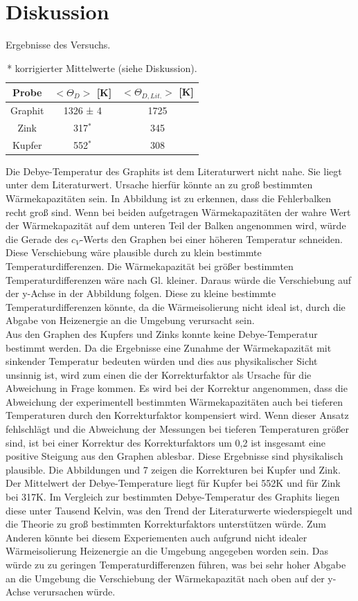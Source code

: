 \documentclass[12pt,a4paper,titlepage,headinclude,bibtotoc]{scrartcl}
\begin{document}
\section{Diskussion}
\begin{table}[h!]
\centering
\caption{Ergebnisse des Versuchs.}
\begin{tabular}{c|c|c}
Probe& $<\Theta_D >$ [K]& $<\Theta_{D,Lit.}>$ [K] \\
\hline
Graphit &1326 ± 4 & 1725\\
\hline
Zink & 317$^*$ & 345\\
\hline
Kupfer & 552$^*$ &308\\
\end{tabular}
\caption*{* korrigierter Mittelwerte (siehe Diskussion).}
\end{table}
\FloatBarrier
Die Debye-Temperatur des Graphits ist dem Literaturwert nicht nahe. Sie liegt unter dem Literaturwert. Ursache hierfür könnte an zu groß bestimmten Wärmekapazitäten sein. In Abbildung ist zu erkennen, dass die Fehlerbalken recht groß sind. Wenn bei beiden aufgetragen Wärmekapazitäten der wahre Wert der Wärmekapazität auf dem unteren Teil der Balken angenommen wird, würde die Gerade des $c_V$-Werts den Graphen bei einer höheren Temperatur schneiden. Diese Verschiebung wäre plausible durch zu klein bestimmte Temperaturdifferenzen. Die Wärmekapazität bei größer bestimmten Temperaturdifferenzen wäre nach Gl. kleiner. Daraus würde die Verschiebung auf der y-Achse in der Abbildung folgen. Diese zu kleine bestimmte Temperaturdifferenzen könnte, da die Wärmeisolierung nicht ideal ist, durch die Abgabe von Heizenergie an die Umgebung verursacht sein. \\
Aus den Graphen des Kupfers und Zinks konnte keine Debye-Temperatur bestimmt werden. Da die Ergebnisse eine Zunahme der Wärmekapazität mit sinkender Temperatur bedeuten würden und dies aus physikalischer Sicht unsinnig ist, wird  zum einen die der Korrekturfaktor als Ursache für die Abweichung in Frage kommen. Es wird bei der Korrektur angenommen, dass die Abweichung der experimentell bestimmten Wärmekapazitäten auch bei tieferen Temperaturen durch den Korrekturfaktor kompensiert wird. Wenn dieser Ansatz fehlschlägt und die Abweichung der Messungen bei tieferen Temperaturen größer sind, ist bei einer Korrektur des Korrekturfaktors um 0,2 ist insgesamt eine positive Steigung aus den Graphen ablesbar. Diese Ergebnisse sind physikalisch plausible. Die Abbildungen und 7 zeigen die Korrekturen bei Kupfer und Zink. Der Mittelwert der Debye-Temperature liegt für Kupfer bei 552\;K und für Zink bei 317\;K. Im Vergleich zur bestimmten Debye-Temperatur des Graphits liegen diese unter Tausend Kelvin, was den Trend der Literaturwerte wiederspiegelt und die Theorie zu groß bestimmten Korrekturfaktors unterstützen würde. Zum Anderen könnte bei diesem Experiementen auch aufgrund nicht idealer Wärmeisolierung Heizenergie an die Umgebung angegeben worden sein. Das würde zu zu geringen Temperaturdifferenzen führen, was bei sehr hoher Abgabe an die Umgebung die Verschiebung der Wärmekapazität nach oben auf der y-Achse verursachen würde. 
\end{document}
